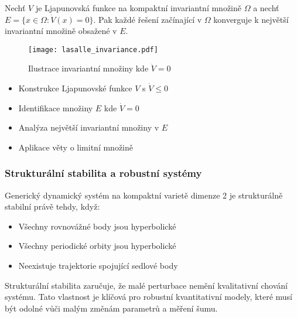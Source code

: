 \begin{theorem}
Nechť $V$ je Ljapunovská funkce na kompaktní invariantní množině $\Omega$ a nechť $E = \{x \in \Omega : \dot{V}(x) = 0\}$. Pak každé řešení začínající v $\Omega$ konverguje k největší invariantní množině obsažené v $E$.
\end{theorem}

\begin{figure}[H]
\centering
\texttt{[image: lasalle\_invariance.pdf]}
\caption{Ilustrace invariantní množiny kde $\dot{V} = 0$}
\label{fig:lasalle_invariance}
\end{figure}

\begin{proofsketch}
\begin{itemize}
\item Konstrukce Ljapunovské funkce $V$ s $\dot{V} \leq 0$
\item Identifikace množiny $E$ kde $\dot{V} = 0$
\item Analýza největší invariantní množiny v $E$
\item Aplikace věty o limitní množině
\end{itemize}
\end{proofsketch}

\subsubsection{Strukturální stabilita a robustní systémy}

\begin{theorem}
Generický dynamický systém na kompaktní varietě dimenze 2 je strukturálně stabilní právě tehdy, když:
\begin{itemize}
\item Všechny rovnovážné body jsou hyperbolické
\item Všechny periodické orbity jsou hyperbolické
\item Neexistuje trajektorie spojující sedlové body
\end{itemize}
\end{theorem}

\begin{keyinsight}
Strukturální stabilita zaručuje, že malé perturbace nemění kvalitativní chování systému. Tato vlastnost je klíčová pro robustní kvantitativní modely, které musí být odolné vůči malým změnám parametrů a měření šumu.
\end{keyinsight}

